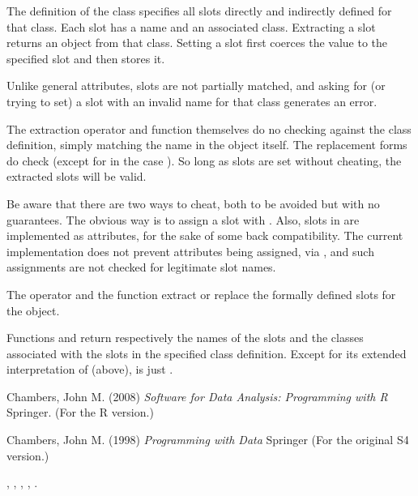 %
\begin{Details}\relax
The definition of the class specifies all slots directly and
indirectly defined for that class.  Each slot has a name and an
associated class.  Extracting a slot returns an object from that
class.  Setting a slot first coerces the value to the specified slot
and then stores it.

Unlike general attributes, slots are not partially matched, and asking
for (or trying to set) a slot with an invalid name for that class
generates an error.

The  extraction operator and 
function themselves do no checking against the class definition,
simply matching the name in the object itself.
The replacement forms do check (except for  in the case
).  So long as slots are set without cheating, the
extracted slots will be valid.

Be aware that there are two ways to cheat, both to be avoided but
with no guarantees.  The obvious way is to assign a slot with
.  Also, slots in \R{} are implemented as
attributes, for the sake of some back compatibility.  The current
implementation does not prevent attributes being assigned, via
, and such assignments are not checked for
legitimate slot names.
\end{Details}
%
\begin{Value}
The  operator and the  function extract or
replace the formally defined slots for the object.

Functions  and  return respectively the
names of the slots and the classes associated with the slots in the
specified class definition.  Except for its extended interpretation of
 (above),  is just .
\end{Value}
%
\begin{References}\relax
Chambers, John M. (2008)
\emph{Software for Data Analysis: Programming with R}
Springer.  (For the R version.)

Chambers, John M. (1998)
\emph{Programming with Data}
Springer (For the original S4 version.)
\end{References}
%
\begin{SeeAlso}\relax
{},
,
,
,
.
\end{SeeAlso}

